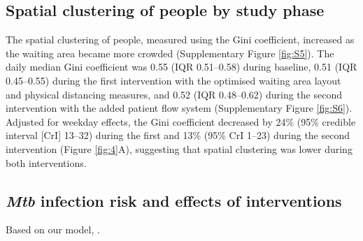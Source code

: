 \documentclass[11pt]{article}
\begin{document}
\subsection{Spatial clustering of people by study phase}\label{spatial-clustering-of-people-by-study-phase}

The spatial clustering of people, measured using the Gini coefficient, increased as the waiting area became more crowded (Supplementary Figure \ref{fig:S5}). The daily median Gini coefficient was 0.55 (IQR 0.51--0.58) during baseline, 0.51 (IQR 0.45--0.55) during the first intervention with the optimised waiting area layout and physical distancing measures, and 0.52 (IQR 0.48--0.62) during the second intervention with the added patient flow system (Supplementary Figure \ref{fig:S6}). Adjusted for weekday effects, the Gini coefficient decreased by 24\% (95\% credible interval {[}CrI{]} 13--32) during the first and 13\% (95\% CrI 1--23) during the second intervention (Figure \ref{fig:4}A), suggesting that spatial clustering was lower during both interventions. \label{chg:R3.3results}

\subsection{\texorpdfstring{\emph{Mtb} infection risk and effects of interventions}{Mtb infection risk and effects of interventions}}\label{mtb-infection-risk-and-effects-of-interventions}

\label{chg:R2.15prev} Based on our model, \label{chg:R2.15rate}. 
\end{document}
